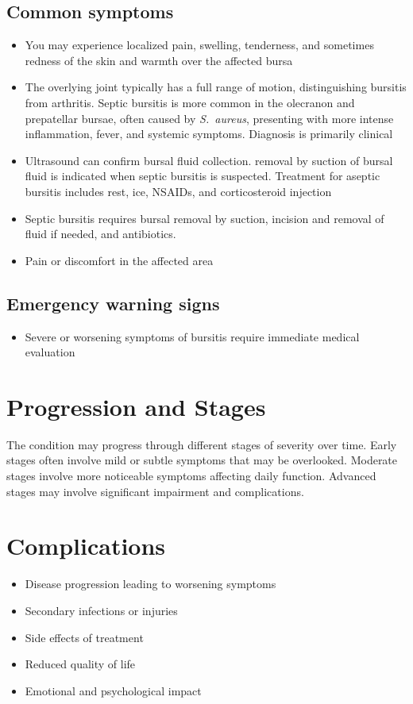 \subsection{Common symptoms}
\begin{itemize}[noitemsep]
  \item You may experience localized pain, swelling, tenderness, and sometimes redness of the skin and warmth over the affected bursa
  \item The overlying joint typically has a full range of motion, distinguishing bursitis from arthritis. Septic bursitis is more common in the olecranon and prepatellar bursae, often caused by \textit{S.~aureus}, presenting with more intense inflammation, fever, and systemic symptoms. Diagnosis is primarily clinical
  \item Ultrasound can confirm bursal fluid collection. removal by suction of bursal fluid is indicated when septic bursitis is suspected. Treatment for aseptic bursitis includes rest, ice, NSAIDs, and corticosteroid injection
  \item Septic bursitis requires bursal removal by suction, incision and removal of fluid if needed, and antibiotics.
  \item Pain or discomfort in the affected area
  \end{itemize}

\subsection{Emergency warning signs}
\begin{itemize}[noitemsep]
  \item Severe or worsening symptoms of bursitis require immediate medical evaluation
\end{itemize}
\section{Progression and Stages}
The condition may progress through different stages of severity over time. Early stages often involve mild or subtle symptoms that may be overlooked. Moderate stages involve more noticeable symptoms affecting daily function. Advanced stages may involve significant impairment and complications.
\section{Complications}
\begin{itemize}[noitemsep]
  \item Disease progression leading to worsening symptoms
  \item Secondary infections or injuries
  \item Side effects of treatment
  \item Reduced quality of life
  \item Emotional and psychological impact
\end{itemize}
